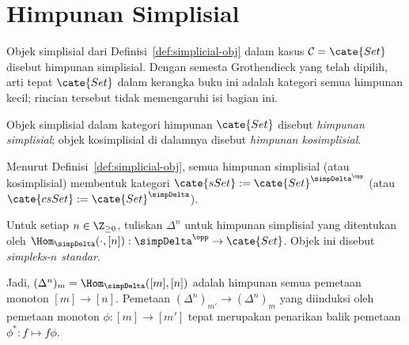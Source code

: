 
\section{Himpunan Simplisial}\label{sec:simplicial-set}
\hypertarget{o014.aljabr2.chapter8.simplicial-sets}{ }
Objek simplisial dari Definisi~\ref{def:simplicial-obj} dalam kasus
$\mathcal{C}=\cate{Set}$ disebut himpunan simplisial. Dengan semesta
Grothendieck yang telah dipilih, arti tepat $\cate{Set}$ dalam kerangka
buku ini adalah kategori semua himpunan kecil; rincian tersebut tidak
memengaruhi isi bagian ini.

\begin{definition}
	Objek simplisial dalam kategori himpunan $\cate{Set}$ disebut
	\emph{himpunan simplisial}; objek kosimplisial di dalamnya disebut
	\emph{himpunan kosimplisial}.
\end{definition}

Menurut Definisi~\ref{def:simplicial-obj}, semua himpunan simplisial (atau
kosimplisial) membentuk kategori
$\cate{sSet}:=\cate{Set}^{\simpDelta^{\opp}}$ (atau
$\cate{csSet}:=\cate{Set}^{\simpDelta}$).

\begin{definition}\label{def:standard-simplicial-set}
	Untuk setiap $n\in\Z_{\geq0}$, tuliskan $\Delta^n$ untuk himpunan
	simplisial yang ditentukan oleh
	$\Hom_{\simpDelta}(\mathord\cdot,[n]):
	\simpDelta^{\opp}\to\cate{Set}$. Objek ini disebut \emph{simpleks-$n$
	standar}.
\end{definition}

Jadi, $(\Delta^n)_m=\Hom_{\simpDelta}([m],[n])$ adalah himpunan semua
pemetaan monoton $[m]\to[n]$. Pemetaan
$(\Delta^n)_{m'}\to(\Delta^n)_m$ yang diinduksi oleh pemetaan monoton
$\phi:[m]\to[m']$ tepat merupakan penarikan balik pemetaan
$\phi^*:f\mapsto f\phi$.

